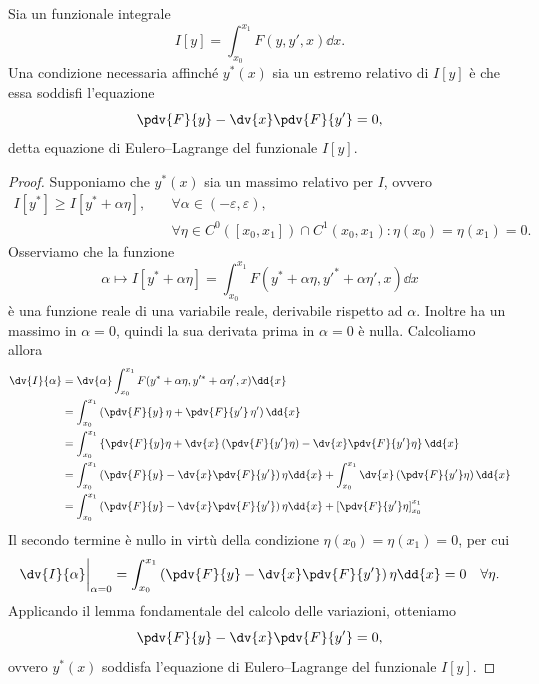 \begin{theorem}[di Eulero] 
    Sia un funzionale integrale
    \begin{equation*}
        I[y] = \int_{x_0}^{x_1} F(y, y', x)\dd{x}.
    \end{equation*}
    Una condizione necessaria affinché $y^*(x)$ sia un estremo relativo di $I[y]$ è che essa soddisfi l'equazione
    \begin{equation*}
        \pdv{F}{y} - \dv{x}\pdv{F}{y'} = 0,
    \end{equation*}
    detta equazione di Eulero--Lagrange del funzionale $I[y]$.
\end{theorem}
\begin{proof}
    Supponiamo che $y^*(x)$ sia un massimo relativo per $I$, ovvero
    \begin{align*}
        I[y^*] \geq I[y^* + \alpha \eta], \quad
        &\forall \alpha \in (-\varepsilon, \varepsilon), \\
        &\forall \eta \in C^0([x_0, x_1])\cap C^1(x_0, x_1): \eta(x_0) = \eta(x_1) = 0.
    \end{align*}
    Osserviamo che la funzione 
    \begin{equation*}
        \alpha \mapsto I[y^* + \alpha \eta] = \int_{x_0}^{x_1} F(y^* + \alpha \eta, y'^* + \alpha \eta', x)\dd{x}
    \end{equation*}
    è una funzione reale di una variabile reale, derivabile rispetto ad $\alpha$. Inoltre ha un massimo in $\alpha = 0$, quindi la sua derivata prima in $\alpha = 0$ è nulla. Calcoliamo allora
    \begin{align*}
        \dv{I}{\alpha} &= \dv{\alpha} \int_{x_0}^{x_1} F(y^* + \alpha \eta, y'^* + \alpha \eta', x)\dd{x} \\ 
        &= \int_{x_0}^{x_1} \left(\pdv{F}{y}\,\eta + \pdv{F}{y'}\,\eta'\right)\dd{x} \\
        &= \int_{x_0}^{x_1}\left\{ \pdv{F}{y}\eta + \dv{x}\left(\pdv{F}{y'}\eta\right) - \dv{x}\pdv{F}{y'}\eta \right\} \dd{x} \\
        &= \int_{x_0}^{x_1} \left(\pdv{F}{y} - \dv{x}\pdv{F}{y'}\right)\eta\dd{x} + \int_{x_0}^{x_1} \dv{x}\left(\pdv{F}{y'}\eta\right) \dd{x}\\
        &= \int_{x_0}^{x_1} \left(\pdv{F}{y} - \dv{x}\pdv{F}{y'}\right)\eta\dd{x} + \left[\pdv{F}{y'}\eta\right]_{x_0}^{x_1}
    \end{align*}
    Il secondo termine è nullo in virtù della condizione $\eta(x_0) = \eta(x_1) = 0$, per cui
    \begin{equation*}
        \dv{I}{\alpha}\bigg|_{\alpha=0} = \int_{x_0}^{x_1} \left(\pdv{F}{y} - \dv{x}\pdv{F}{y'}\right)\eta\dd{x} = 0 \quad \forall \eta.
    \end{equation*}
    Applicando il lemma fondamentale del calcolo delle variazioni, otteniamo
    \begin{equation*}
        \pdv{F}{y} - \dv{x}\pdv{F}{y'} = 0,
    \end{equation*}
    ovvero $y^*(x)$ soddisfa l'equazione di Eulero--Lagrange del funzionale $I[y]$.
\end{proof}

